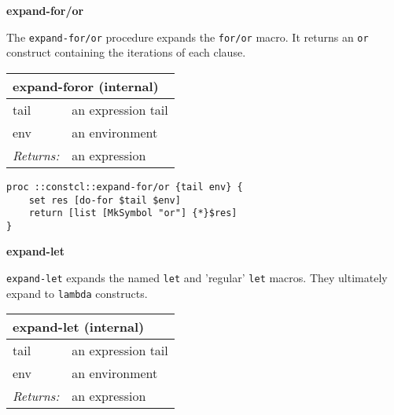 \documentclass{report}
\begin{document}
\textbf{expand-for/or}


The \texttt{expand-for/or} procedure expands the \texttt{for/or} macro. It returns an \texttt{or} construct containing the iterations of each clause.

\begin{tabular}{ |l l| }
\hline
\multicolumn{2}{|l|}{expand-foror (internal)} \\
\hline
tail & an expression tail \\
env & an environment \\
\textit{Returns:} & an expression \\
\hline
\end{tabular}

\noindent\makebox[\linewidth]{\rule{\linewidth}{0.4pt}}
\begin{lstlisting}
proc ::constcl::expand-for/or {tail env} {
    set res [do-for $tail $env]
    return [list [MkSymbol "or"] {*}$res]
}
\end{lstlisting}
\noindent\makebox[\linewidth]{\rule{\linewidth}{0.4pt}}

\textbf{expand-let}


\texttt{expand-let} expands the named \texttt{let} and 'regular' \texttt{let} macros. They ultimately expand to \texttt{lambda} constructs.

\begin{tabular}{ |l l| }
\hline
\multicolumn{2}{|l|}{expand-let (internal)} \\
\hline
tail & an expression tail \\
env & an environment \\
\textit{Returns:} & an expression \\
\hline
\end{tabular}
\end{document}
